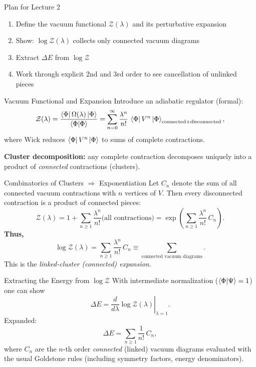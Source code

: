 \documentclass[aspectratio=169,11pt]{beamer}
\newcommand{\V}{V}
\newcommand{\ketPhi}{\ket{\Phi}}                      %
\newcommand{\braPhi}{\bra{\Phi}}
\newcommand{\Z}{\mathcal{Z}}
\begin{document}
\begin{frame}{Plan for Lecture 2}
\begin{enumerate}
  \item Define the vacuum functional $\Z(\lambda)$ and its perturbative expansion
  \item Show: $\log \Z(\lambda)$ collects only connected vacuum diagrams
  \item Extract $\Delta E$ from $\log \Z$
  \item Work through explicit 2nd and 3rd order to see cancellation of unlinked pieces
\end{enumerate}
\end{frame}

\begin{frame}{Vacuum Functional and Expansion}
Introduce an adiabatic regulator (formal):
\[
\Z(\lambda)=\frac{\braPhi \Omega(\lambda)\ketPhi}{\braket{\Phi}{\Phi}}
= \sum_{n=0}^{\infty}\frac{\lambda^n}{n!}\,\braPhi \V^n \ketPhi_{\text{connected+disconnected}},
\]
where Wick reduces $\braPhi \V^n \ketPhi$ to sums of complete contractions.
\smallskip

\textbf{Cluster decomposition:} any complete contraction decomposes uniquely into a product of \emph{connected} contractions (clusters).
\end{frame}

\begin{frame}{Combinatorics of Clusters $\Rightarrow$ Exponentiation}
Let $C_n$ denote the sum of all connected vacuum contractions with $n$ vertices of $\V$. Then every disconnected contraction is a product of connected pieces:
\[
\Z(\lambda)= 1 + \sum_{n\ge 1} \frac{\lambda^n}{n!}\Big(\text{all contractions}\Big)
= \exp\!\left(\sum_{n\ge 1}\frac{\lambda^n}{n!}\, C_n\right).
\]
\textbf{Thus,}
\[
\boxed{\log\Z(\lambda)=\sum_{n\ge 1}\frac{\lambda^n}{n!}\, C_n \equiv \sum_{\text{connected vacuum diagrams}}.}
\]
This is the \emph{linked-cluster (connected) expansion}.
\end{frame}

\begin{frame}{Extracting the Energy from $\log \Z$}
With intermediate normalization ($\braket{\Phi}{\Psi}=1$) one can show
\[
\Delta E = \left.\frac{d}{d\lambda}\log\Z(\lambda)\right|_{\lambda=1}.
\]
Expanded:
\[
\Delta E = \sum_{n\ge 1}\frac{1}{n!}\, C_n,
\]
where $C_n$ are the $n$-th order \emph{connected} (linked) vacuum diagrams evaluated with the usual Goldstone rules (including symmetry factors, energy denominators).
\end{frame}
\end{document}
